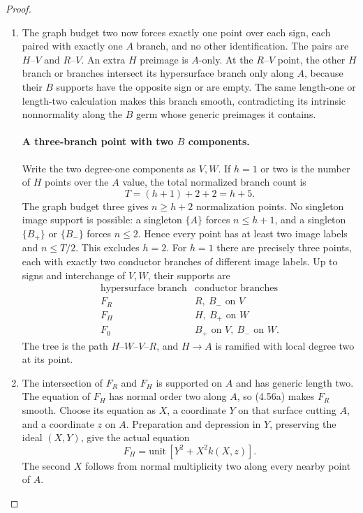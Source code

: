 \begin{proof}
\begin{enumerate}[label={$\langle1\rangle$\arabic*.},leftmargin=*]
\item The graph budget two now forces exactly one point over
each sign, each paired with exactly one $A$ branch, and
no other identification. The pairs are $H$--$V$ and
$R$--$V$. An extra $H$ preimage is $A$-only. At the
$R$--$V$ point, the other $H$ branch or branches intersect
its hypersurface branch only along $A$, because their
$B$ supports have the opposite sign or are empty. The
same length-one or length-two calculation makes this
branch smooth, contradicting its intrinsic nonnormality
along the $B$ germ whose generic preimages it contains.

\paragraph{A three-branch point with two $B$ components.}
Write the two degree-one components as $V,W$. If $h=1$
or two is the number of $H$ points over the $A$ value,
the total normalized branch count is
\[
                         T=(h+1)+2+2=h+5.
\]
The graph budget three gives $n\ge h+2$ normalization
points. No singleton image support is possible: a
singleton $\{A\}$ forces $n\le h+1$, and a singleton
$\{B_+\}$ or $\{B_-\}$ forces $n\le2$. Hence every
point has at least two image labels and $n\le T/2$.
This excludes $h=2$. For $h=1$ there are precisely
three points, each with exactly two conductor branches
of different image labels. Up to signs and interchange
of $V,W$, their supports are
\[
 \begin{array}{c|c}
 \text{hypersurface branch}&\text{conductor branches}\\ \hline
 F_R&R,\ B_-\text{ on }V\\
 F_H&H,\ B_+\text{ on }W\\
 F_0&B_+\text{ on }V,\ B_-\text{ on }W.
 \end{array}
                                                            \tag{4.56b}
\]
The tree is the path $H$--$W$--$V$--$R$, and $H\to A$
is ramified with local degree two at its point.

\item The intersection of $F_R$ and $F_H$ is supported on $A$
and has generic length two. The equation of $F_H$ has
normal order two along $A$, so (4.56a) makes $F_R$
smooth. Choose its equation as $X$, a coordinate $Y$
on that surface cutting $A$, and a coordinate $z$ on
$A$. Preparation and depression in $Y$, preserving the
ideal $(X,Y)$, give the actual equation
\[
                       F_H=\text{unit}\,[Y^2+X^2k(X,z)].
                                                            \tag{4.56c}
\]
The second $X$ follows from normal multiplicity two
along every nearby point of $A$.


\end{enumerate}
\end{proof}
